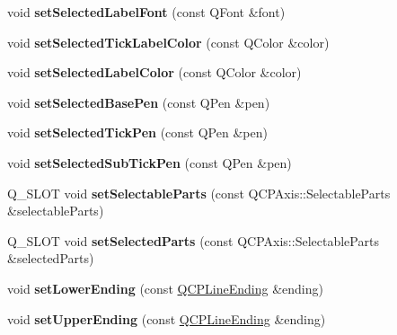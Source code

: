 \begin{DoxyCompactItemize}
\item 
\mbox{\label{class_q_c_p_axis_a02ec2a75d4d8401eaab834fbc6803d30}} 
void {\bfseries set\+Selected\+Label\+Font} (const Q\+Font \&font)
\item 
\mbox{\label{class_q_c_p_axis_a9bdbf5e63ab15187f3a1de9440129227}} 
void {\bfseries set\+Selected\+Tick\+Label\+Color} (const Q\+Color \&color)
\item 
\mbox{\label{class_q_c_p_axis_a5d502dec597c634f491fdd73d151c72d}} 
void {\bfseries set\+Selected\+Label\+Color} (const Q\+Color \&color)
\item 
\mbox{\label{class_q_c_p_axis_aeb917a909215605b95ef2be843de1ee8}} 
void {\bfseries set\+Selected\+Base\+Pen} (const Q\+Pen \&pen)
\item 
\mbox{\label{class_q_c_p_axis_a8360502685eb782edbf04019c9345cdc}} 
void {\bfseries set\+Selected\+Tick\+Pen} (const Q\+Pen \&pen)
\item 
\mbox{\label{class_q_c_p_axis_a2a00a7166600155eac26843132eb9576}} 
void {\bfseries set\+Selected\+Sub\+Tick\+Pen} (const Q\+Pen \&pen)
\item 
\mbox{\label{class_q_c_p_axis_ab2d5ab07ad9e7f0e5529e1fb5d00712e}} 
Q\+\_\+\+S\+L\+OT void {\bfseries set\+Selectable\+Parts} (const Q\+C\+P\+Axis\+::\+Selectable\+Parts \&selectable\+Parts)
\item 
\mbox{\label{class_q_c_p_axis_a816a132715d851b7016c9740b880464c}} 
Q\+\_\+\+S\+L\+OT void {\bfseries set\+Selected\+Parts} (const Q\+C\+P\+Axis\+::\+Selectable\+Parts \&selected\+Parts)
\item 
\mbox{\label{class_q_c_p_axis_a08af1c72db9ae4dc8cb8a973d44405ab}} 
void {\bfseries set\+Lower\+Ending} (const \hyperlink{class_q_c_p_line_ending}{Q\+C\+P\+Line\+Ending} \&ending)
\item 
\mbox{\label{class_q_c_p_axis_a69119b892fc306f651763596685aa377}} 
void {\bfseries set\+Upper\+Ending} (const \hyperlink{class_q_c_p_line_ending}{Q\+C\+P\+Line\+Ending} \&ending)

\end{DoxyCompactItemize}

